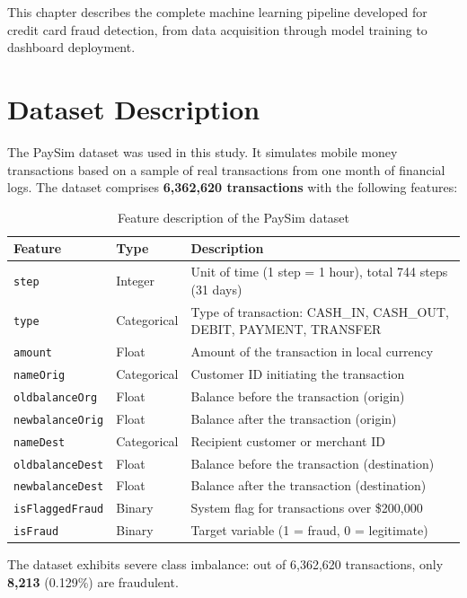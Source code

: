 \documentclass[12pt,a4paper]{report}
\begin{document}
This chapter describes the complete machine learning pipeline developed for credit card fraud detection, from data acquisition through model training to dashboard deployment.

\section{Dataset Description}

The PaySim dataset \cite{lopezrojas2016paysim} was used in this study. It simulates mobile money transactions based on a sample of real transactions from one month of financial logs. The dataset comprises \textbf{6,362,620 transactions} with the following features:

\begin{table}[h!]
\centering
\caption{Feature description of the PaySim dataset}
\label{tab:features}
\begin{tabular}{@{}llp{8cm}@{}}
\toprule
\textbf{Feature} & \textbf{Type} & \textbf{Description} \\
\midrule
\texttt{step} & Integer & Unit of time (1 step = 1 hour), total 744 steps (31 days) \\
\texttt{type} & Categorical & Type of transaction: CASH\_IN, CASH\_OUT, DEBIT, PAYMENT, TRANSFER \\
\texttt{amount} & Float & Amount of the transaction in local currency \\
\texttt{nameOrig} & Categorical & Customer ID initiating the transaction \\
\texttt{oldbalanceOrg} & Float & Balance before the transaction (origin) \\
\texttt{newbalanceOrig} & Float & Balance after the transaction (origin) \\
\texttt{nameDest} & Categorical & Recipient customer or merchant ID \\
\texttt{oldbalanceDest} & Float & Balance before the transaction (destination) \\
\texttt{newbalanceDest} & Float & Balance after the transaction (destination) \\
\texttt{isFlaggedFraud} & Binary & System flag for transactions over \$200,000 \\
\texttt{isFraud} & Binary & Target variable (1 = fraud, 0 = legitimate) \\
\bottomrule
\end{tabular}
\end{table}

The dataset exhibits severe class imbalance: out of 6,362,620 transactions, only \textbf{8,213} (0.129\%) are fraudulent.
\end{document}
